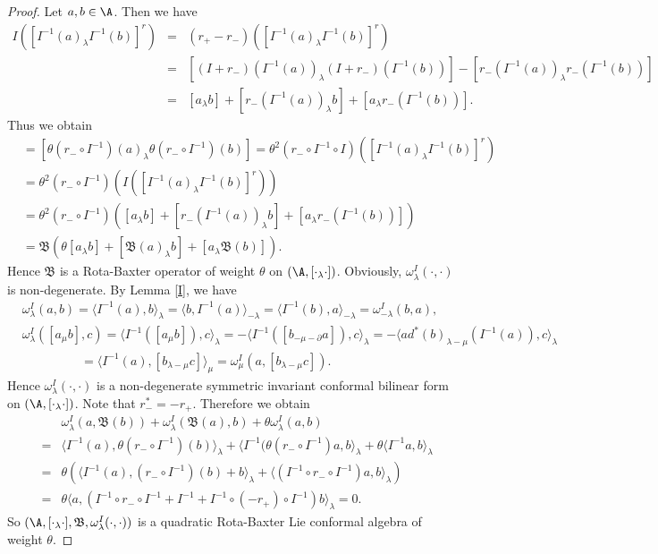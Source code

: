 \documentclass[12pt]{amsart}
\begin{document}
\begin{proof}
Let $a,b\in \A$. Then we have
\begin{eqnarray}
    I([I^{-1}(a)_\lambda I^{-1}(b)]^r)&=&(r_+-r_-)([I^{-1}(a)_\lambda I^{-1}(b)]^r)\label{eq-q1}\\
    &=&[(I+r_-)(I^{-1}(a))_\lambda (I+r_-)(I^{-1}(b)) ]-[r_-(I^{-1}(a))_\lambda r_-(I^{-1}(b))]\nonumber\\
    &=&[a_\lambda b]+[r_-(I^{-1}(a))_\lambda b]+[a_\lambda r_-(I^{-1}(b))].\nonumber
\end{eqnarray}
Thus we obtain
\begin{align*}
    [\mathfrak{B}(a)_\lambda \mathfrak{B}(b)]&=[\theta (r_-\circ I^{-1})(a)_\lambda \theta (r_-\circ I^{-1})(b) ]
    =\theta^2 (r_-\circ I^{-1}\circ I)([I^{-1}(a)_\lambda  I^{-1} (b)]^r)\\
    &=\theta^2 (r_-\circ I^{-1})(I([I^{-1}(a)_\lambda  I^{-1} (b)]^r))\\
    &=\theta^2 (r_-\circ I^{-1})([a_\lambda b]+[r_-(I^{-1}(a))_\lambda b]+[a_\lambda r_-(I^{-1}(b))])\\
    &=\mathfrak{B}(\theta[a_\lambda b]+[\mathfrak{B}(a)_\lambda b]+[a_\lambda
    \mathfrak{B}(b)]).
\end{align*}
Hence $\mathfrak{B}$ is a Rota-Baxter operator of weight $\theta$
on $(\A,[\cdot_\lambda \cdot])$. Obviously,
$\omega^I_\lambda(\cdot,\cdot)$ is non-degenerate. By Lemma
\ref{I}, we have
\begin{align*}
    &\omega_\lambda^I(a,b)=\langle I^{-1}(a),b\rangle_\lambda=\langle b,I^{-1}(a)\rangle_{-\lambda}=\langle I^{-1}(b),a\rangle_{-\lambda}
    =\omega_{-\lambda}^I(b,a),\\
    &\omega_{\lambda}^I([a_\mu b],c)=\langle I^{-1}([a_\mu b]),c\rangle_\lambda=-\langle I^{-1}([b_{-\mu-\partial} a]),c\rangle_\lambda =-\langle ad^* (b)_{\lambda-\mu}(I^{-1}(a)),c\rangle_\lambda\\
    &\qquad\qquad\,\,\,\,=\langle I^{-1}(a),[b_{\lambda-\mu}c]\rangle_\mu=\omega_\mu^I(a,[b_{\lambda-\mu
    }c]).
\end{align*}
Hence $\omega^I_\lambda(\cdot,\cdot) $ is a non-degenerate symmetric invariant
conformal bilinear form on $(\A,[\cdot_\lambda\cdot])$. Note that
$r_-^\ast=-r_+$. Therefore we obtain
\begin{eqnarray*}
    &&\omega_{\lambda}^I(a,\mathfrak{B}(b))+\omega_{\lambda}^I(\mathfrak{B}(a),b)+\theta\omega_{\lambda}^I(a,b)\\
    &=&\langle I^{-1} (a),\theta (r_-\circ I^{-1})(b)\rangle_\lambda +\langle I^{-1}(\theta (r_-\circ I^{-1})a,b\rangle_\lambda +\theta\langle I^{-1}a,b\rangle_\lambda\\
    &=&\theta( \langle I^{-1}(a),(r_-\circ I^{-1})(b)+b\rangle_\lambda+\langle (I^{-1}\circ r_-\circ I^{-1})a,b\rangle_\lambda)\\
    &=&\theta\langle a,(I^{-1}\circ r_-\circ I^{-1}+I^{-1}+I^{-1}\circ (-r_+)\circ I^{-1})b\rangle_\lambda=0.
\end{eqnarray*}
So
$(\A,[\cdot_\lambda\cdot],\mathfrak{B},\omega^I_\lambda(\cdot,\cdot))$
is a quadratic    Rota-Baxter Lie conformal
algebra of weight  $\theta$.
\end{proof}
\end{document}
